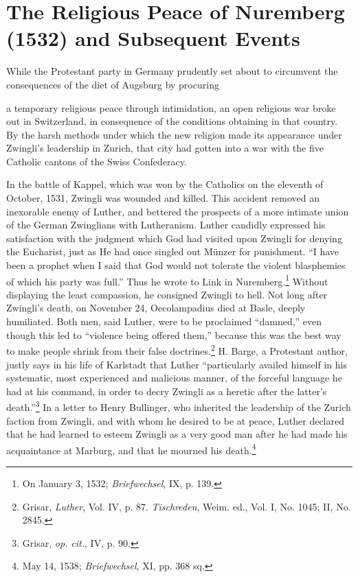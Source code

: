 \section{The Religious Peace of Nuremberg (1532) and Subsequent Events}

While the Protestant party in Germany prudently set about to
circumvent the consequences of the diet of Augsburg by procuring

a temporary religious peace through intimidation, an open religious
war broke out in Switzerland, in consequence of the conditions
obtaining in that country. By the harsh methods under which the
new religion made its appearance under Zwingli’s leadership in
Zurich, that city had gotten into a war with the five Catholic
cantons of the Swiss Confederacy.

In the battle of Kappel, which was won by the Catholics on the
eleventh of October, 1531, Zwingli was wounded and killed. This
accident removed an inexorable enemy of Luther, and bettered the
prospects of a more intimate union of the German Zwinglians with
Lutheranism. Luther candidly expressed his satisfaction with the
judgment which God had visited upon Zwingli for denying the Eucharist,
just as He had once singled out Münzer for punishment. “I
have been a prophet when I said that God would not tolerate the
violent blasphemies of which his party was full.” Thus he wrote to
Link in Nuremberg.\footnote{On January 3, 1532; \textit{Briefwechsel}, IX, p. 139.}
 Without displaying the least compassion, he
consigned Zwingli to hell. Not long after Zwingli’s death, on November
24, Oecolampadius died at Basle, deeply humiliated. Both men,
said Luther, were to be proclaimed “damned,” even though this led to
“violence being offered them,” because this was the best way to
make people shrink from their false doctrines.\footnote{Grisar, \textit{Luther}, Vol. IV, p. 87. \textit{Tischreden}, Weim. ed., Vol. I, No. 1045; II, No. 2845.}
 H. Barge, a Protestant
author, justly says in his life of Karlstadt that Luther “particularly
availed himself in his systematic, most experienced and malicious
manner, of the forceful language he had at his command, in order
to decry Zwingli as a heretic after the latter’s death.”\footnote{Grisar, \textit{op. cit.}, IV, p. 90.}
 In a letter
to Henry Bullinger, who inherited the leadership of the Zurich
faction from Zwingli, and with whom he desired to be at peace,
Luther declared that he had learned to esteem Zwingli as a very
good man after he had made his acquaintance at Marburg, and that
he mourned his death.\footnote{May 14, 1538; \textit{Briefwechsel}, XI, pp. 368 sq.}



